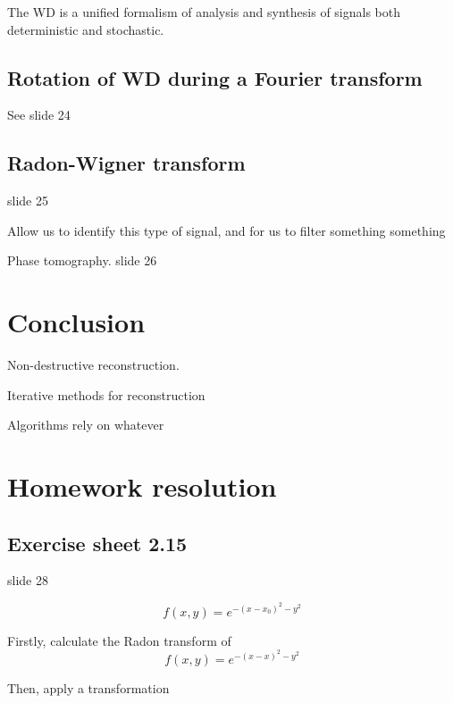 \documentclass[../main/main.tex]{subfiles}
\begin{document}
The WD is a unified formalism of analysis and synthesis of signals both deterministic and stochastic.

\subsection{Rotation of WD during a Fourier transform}

See slide 24

\subsection{Radon-Wigner transform}

slide 25

Allow us to identify this type of signal, and for us to filter something something

Phase tomography. slide 26

\section{Conclusion}

Non-destructive reconstruction.

Iterative methods for reconstruction

Algorithms rely on whatever


\section{Homework resolution}

\subsection{Exercise sheet 2.15}

slide 28

\begin{equation}
f(x,y) = e^{-(x-x_{0})^{2} - y^{2}}
\end{equation}


Firstly, calculate the Radon transform of
\begin{equation}
f(x,y) = e^{-(x-x)^{2} - y^{2}}
\end{equation}

Then, apply a transformation
\end{document}
